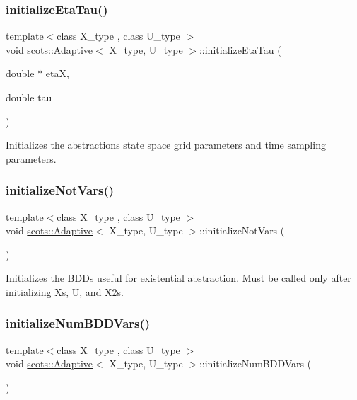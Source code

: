 \subsubsection{\texorpdfstring{initialize\+Eta\+Tau()}{initializeEtaTau()}}
{\footnotesize\ttfamily template$<$class X\+\_\+type , class U\+\_\+type $>$ \\
void \hyperlink{classscots_1_1Adaptive}{scots\+::\+Adaptive}$<$ X\+\_\+type, U\+\_\+type $>$\+::initialize\+Eta\+Tau (\begin{DoxyParamCaption}\item[{double $\ast$}]{etaX,  }\item[{double}]{tau }\end{DoxyParamCaption})\hspace{0.3cm}{\ttfamily [inline]}}

Initializes the abstractions\textquotesingle{} state space grid parameters and time sampling parameters. \mbox{\label{classscots_1_1Adaptive_a6a9af6f25e8c4015ceb24d704da26972}} 
\subsubsection{\texorpdfstring{initialize\+Not\+Vars()}{initializeNotVars()}}
{\footnotesize\ttfamily template$<$class X\+\_\+type , class U\+\_\+type $>$ \\
void \hyperlink{classscots_1_1Adaptive}{scots\+::\+Adaptive}$<$ X\+\_\+type, U\+\_\+type $>$\+::initialize\+Not\+Vars (\begin{DoxyParamCaption}{ }\end{DoxyParamCaption})\hspace{0.3cm}{\ttfamily [inline]}}

Initializes the B\+D\+Ds useful for existential abstraction. Must be called only after initializing Xs, U, and X2s. \mbox{\label{classscots_1_1Adaptive_ab75f4bbed30ecc70747185f36fcab200}} 
\subsubsection{\texorpdfstring{initialize\+Num\+B\+D\+D\+Vars()}{initializeNumBDDVars()}}
{\footnotesize\ttfamily template$<$class X\+\_\+type , class U\+\_\+type $>$ \\
void \hyperlink{classscots_1_1Adaptive}{scots\+::\+Adaptive}$<$ X\+\_\+type, U\+\_\+type $>$\+::initialize\+Num\+B\+D\+D\+Vars (\begin{DoxyParamCaption}{ }\end{DoxyParamCaption})\hspace{0.3cm}{\ttfamily [inline]}}

